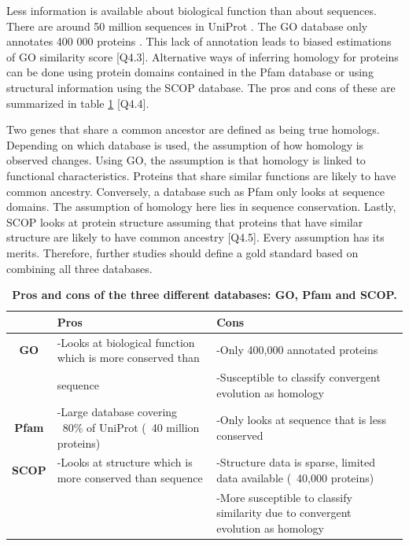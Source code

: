 \documentclass{article}
\begin{document}
Less information is available about biological function than about sequences. There are around 50 million sequences in UniProt \citep{consortium_uniprot:_2015}. The GO database only annotates 400 000 proteins \citep{consortium_gene_2015}. This lack of annotation leads to biased estimations of GO similarity score [Q4.3]. Alternative ways of inferring homology for proteins can be done using protein domains contained in the Pfam database or using structural information using the SCOP database. The pros and cons of these are summarized in table \ref{table:db} [Q4.4]. 

Two genes that share a common ancestor are defined as being true homologs. Depending on which database is used, the assumption of how homology is observed changes. Using GO, the assumption is that homology is linked to functional characteristics. Proteins that share similar functions are likely to have common ancestry. Conversely, a database such as Pfam only looks at sequence domains. The assumption of homology here lies in sequence conservation. Lastly, SCOP looks at protein structure assuming that proteins that have similar structure are likely to have common ancestry [Q4.5]. Every assumption has its merits. Therefore, further studies should define a gold standard based on combining all three databases.

\begin{table}[bh!]
\centering
\caption{\textbf{Pros and cons of the three different databases: GO, Pfam and SCOP.}}
\label{table:db}
\begin{tabular}{|c|p{5cm}|p{5cm}|}
\hline
     & \textbf{Pros}                                                                            & \textbf{Cons}                                                                            \\ \hline
\textbf{GO}   &  -Looks at biological function which is more conserved than  &  -Only 400,000 annotated proteins                                                 \\ 
     & sequence                                                                                &  -Susceptible to classify convergent evolution as homology \\ \hline
\textbf{Pfam} &  -Large database covering ~80\% of UniProt (~40 million proteins)                 &  -Only looks at sequence that is less conserved                                \\ \hline
\textbf{SCOP} &  -Looks at structure which is more conserved than sequence                        &  -Structure data is sparse, limited data available (~40,000 proteins)
\\ 
     &                                                                                 &  -More susceptible to classify similarity due to convergent evolution as homology \\ \hline
\end{tabular}
\end{table}
\end{document}
